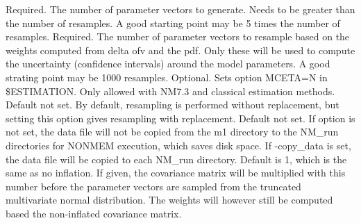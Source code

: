 \begin{optionlist}
Required. The number of parameter vectors to generate. Needs to be greater than the number of resamples. A good starting point may be 5 times the number of resamples.
\nextopt
{}
Required. The number of parameter vectors to resample based on the weights
computed from delta ofv and the pdf. Only these will be used to compute the uncertainty (confidence intervals) around the model parameters. A good strating point may be 1000 resamples.
\nextopt
{}
Optional. Sets option MCETA=N in \$ESTIMATION. Only allowed with NM7.3 and classical estimation methods.
\nextopt
{}
Default not set. By default, resampling is performed without replacement, but setting this option gives resampling with replacement.
\nextopt
{}
Default not set. If option is not set, the data file will not be copied from the m1 directory to the NM\_run directories for NONMEM execution, which saves disk space. If -copy\_data is set, the data file will be copied to each NM\_run directory.
\nextopt
{}
Default is 1, which is the same as no inflation. If given, the covariance
matrix will be multiplied with this number before the parameter vectors
are sampled from the truncated multivariate normal distribution.
The weights will however still be computed based the non-inflated covariance matrix. 
\nextopt
\end{optionlist}


